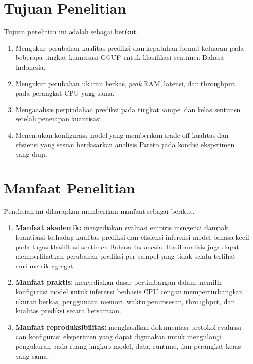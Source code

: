 \section{Tujuan Penelitian}

Tujuan penelitian ini adalah sebagai berikut.

\begin{enumerate}
  \item Mengukur perubahan kualitas prediksi dan kepatuhan format keluaran pada beberapa tingkat kuantisasi GGUF untuk klasifikasi sentimen Bahasa Indonesia.
  \item Mengukur perubahan ukuran berkas, \textit{peak} RAM, latensi, dan throughput pada perangkat CPU yang sama.
  \item Menganalisis perpindahan prediksi pada tingkat sampel dan kelas sentimen setelah penerapan kuantisasi.
  \item Menentukan konfigurasi model yang memberikan trade-off kualitas dan efisiensi yang sesuai berdasarkan analisis Pareto pada kondisi eksperimen yang diuji.
\end{enumerate}

\section{Manfaat Penelitian}

Penelitian ini diharapkan memberikan manfaat sebagai berikut.

\begin{enumerate}
  \item \textbf{Manfaat akademik:} menyediakan evaluasi empiris mengenai dampak kuantisasi terhadap kualitas prediksi dan efisiensi inferensi model bahasa kecil pada tugas klasifikasi sentimen Bahasa Indonesia. Hasil analisis juga dapat memperlihatkan perubahan prediksi per sampel yang tidak selalu terlihat dari metrik agregat.
  \item \textbf{Manfaat praktis:} menyediakan dasar pertimbangan dalam memilih konfigurasi model untuk inferensi berbasis CPU dengan mempertimbangkan ukuran berkas, penggunaan memori, waktu pemrosesan, throughput, dan kualitas prediksi secara bersamaan.
  \item \textbf{Manfaat reproduksibilitas:} menghasilkan dokumentasi protokol evaluasi dan konfigurasi eksperimen yang dapat digunakan untuk mengulangi pengukuran pada ruang lingkup model, data, runtime, dan perangkat keras yang sama.
\end{enumerate}
